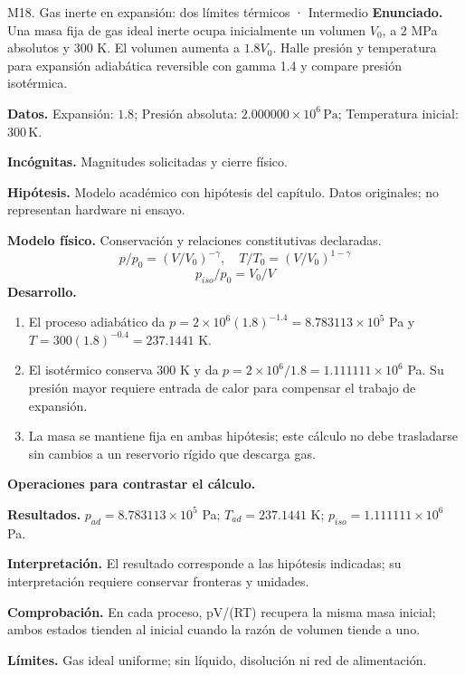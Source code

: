 \begin{studiumworked}{M18. Gas inerte en expansión: dos límites térmicos · Intermedio}
\textbf{Enunciado.} Una masa fija de gas ideal inerte ocupa inicialmente un volumen $V_0$, a 2 MPa absolutos y 300 K. El volumen aumenta a $1.8V_0$. Halle presión y temperatura para expansión adiabática reversible con gamma 1.4 y compare presión isotérmica.

\textbf{Datos.} Expansión: $1.8$; Presión absoluta: $2.000000\times10^{6}\,\mathrm{Pa}$; Temperatura inicial: $300\,\mathrm{K}$.

\textbf{Incógnitas.} Magnitudes solicitadas y cierre físico.

\textbf{Hipótesis.} Modelo académico con hipótesis del capítulo. Datos originales; no representan hardware ni ensayo.

\textbf{Modelo físico.} Conservación y relaciones constitutivas declaradas.
\[p/p_0=(V/V_0)^{-\gamma},\quad T/T_0=(V/V_0)^{1-\gamma}\]
\[p_{iso}/p_0=V_0/V\]
\textbf{Desarrollo.}
\begin{enumerate}
\item El proceso adiabático da $p=2\times10^6(1.8)^{-1.4}=8.783113\times10^{5}$ Pa y $T=300(1.8)^{-0.4}=237.1441$ K.
\item El isotérmico conserva 300 K y da $p=2\times10^6/1.8=1.111111\times10^{6}$ Pa. Su presión mayor requiere entrada de calor para compensar el trabajo de expansión.
\item La masa se mantiene fija en ambas hipótesis; este cálculo no debe trasladarse sin cambios a un reservorio rígido que descarga gas.
\end{enumerate}
\textbf{Operaciones para contrastar el cálculo.}

\textbf{Resultados.} $p_{ad}=8.783113\times10^{5}$ Pa; $T_{ad}=237.1441$ K; $p_{iso}=1.111111\times10^{6}$ Pa.

\textbf{Interpretación.} El resultado corresponde a las hipótesis indicadas; su interpretación requiere conservar fronteras y unidades.

\textbf{Comprobación.} En cada proceso, pV/(RT) recupera la misma masa inicial; ambos estados tienden al inicial cuando la razón de volumen tiende a uno.

\textbf{Límites.} Gas ideal uniforme; sin líquido, disolución ni red de alimentación.
\end{studiumworked}
